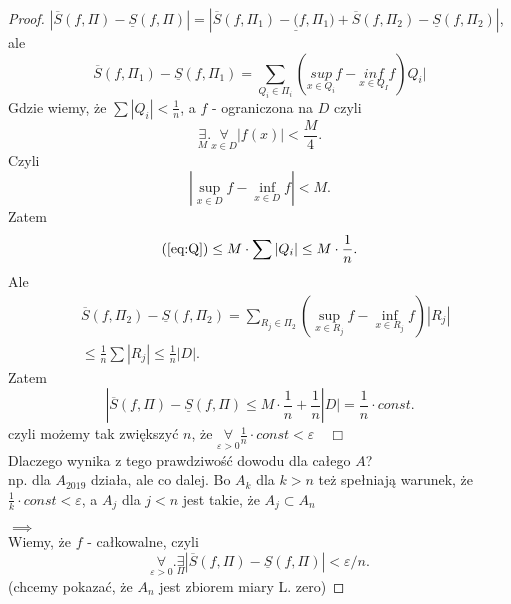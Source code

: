 \documentclass[../main.tex]{subfiles}
\begin{document}
\begin{proof}
        $|\overline{S}(f,\Pi) - \underline{S}(f,\Pi)| = |\overline{S}(f,\Pi_1) - \underline(f,\Pi_1) + \overline{S}(f,\Pi_2) - \underline{S}(f,\Pi_2)|$, ale
        \begin{equation}\label{eq:Q}
            \overline{S}(f,\Pi_1) - \underline{S}(f,\Pi_1) = \sum_{Q_i\in\Pi_i}(\underset{x\in Q_i}{sup} f - \underset{x\in Q_I}{inf} f) Q_i |
        \end{equation}
        Gdzie wiemy, że $\sum |Q_i| < \frac{1}{n}$, a $f$ - ograniczona na $D$ czyli
        \[
            \underset{M}{\exists} .\underset{x\in D}{\forall} |f(x)| < \frac{M}{4}
        .\] Czyli
        \[
        |\underset{x\in D}{\sup} f - \underset{x\in D}{\inf} f | < M
        .\] Zatem
        \[
            \text{(\ref{eq:Q})} \le M \cdot \sum |Q_i| \le M \cdot  \frac{1}{n}
        .\]
        Ale
        \begin{align*}
            &\overline{S}(f,\Pi_2) - \underline{S}(f,\Pi_2) = \sum_{R_j \in \Pi_2}(\underset{x\in R_j}{\sup} f - \underset{x\in R_j}{\inf} f) |R_j|\\
            &\le \frac{1}{n} \sum |R_j| \le \frac{1}{n} |D|
        .\end{align*}
        Zatem
        \[
            |\overline{S}(f,\Pi) - \underline{S}(f,\Pi) \le M \cdot \frac{1}{n} + \frac{1}{n} |D| = \frac{1}{n} \cdot  const
        .\]
        czyli możemy tak zwiększyć $n$, że $\underset{\varepsilon>0}{\forall} \frac{1}{n}\cdot const < \varepsilon \quad\Box$\\
        Dlaczego wynika z tego prawdziwość dowodu dla całego $A$?\\
        np. dla $A_{2019}$ działa, ale co dalej. Bo $A_k$ dla $k>n$ też spełniają warunek, że $\frac{1}{k}\cdot const < \varepsilon$, a $A_j$ dla $j<n$ jest takie, że $A_j \subset A_n$

        $\implies$\\
        Wiemy, że $f$ - całkowalne, czyli
        \[
            \underset{\varepsilon>0}{\forall} . \underset{\Pi}{\exists} |\overline{S}(f,\Pi) - \underline{S}(f,\Pi) | < \varepsilon / n
        .\] (chcemy pokazać, że $A_n$ jest zbiorem miary L. zero)


\end{proof}
\end{document}
